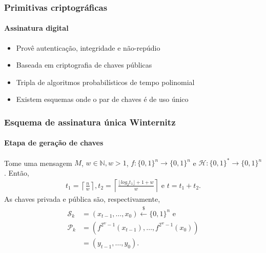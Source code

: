 \documentclass[12pt]{beamer}
\newcommand{\hh}{\mathcal{H}}
\newcommand{\pk}{\mathcal{P}_k}
\newcommand{\sk}{\mathcal{S}_k}
\newcommand{\binwds}[1]{\{0, 1\}^{#1}}
\newcommand{\fhash}[1]{\hh{}: \binwds{*} \longrightarrow{} \binwds{#1}}
\newcommand{\random}{\stackrel{\$}{\longleftarrow}}
\begin{document}
\begin{frame}
  \frametitle{Primitivas criptográficas}
  \framesubtitle{Assinatura digital}
  \begin{itemize}
    \item Provê autenticação, integridade e não-repúdio
    \item Baseada em criptografia de chaves públicas
    \item Tripla de algoritmos probabilísticos
      de tempo polinomial~\cite{Goldreich:book:2004}
  \end{itemize}
  \begin{figure}
    \centering
  \end{figure}
  \begin{itemize}
    \item Existem esquemas onde o par de chaves é de uso único
  \end{itemize}
\end{frame}

\begin{frame}
  \frametitle{Esquema de assinatura única Winternitz}
  \framesubtitle{Etapa de geração de chaves}
  Tome uma mensagem $M$, $w \in \mathbb{N}, w > 1$,
  $f : \binwds{n} \longrightarrow \binwds{n}$ e $\fhash{n}$. Então,
  \begin{align*}
    t_1 = \left\lceil \frac{n}{w} \right\rceil,
    t_2 = \left\lceil \frac{\lfloor log_2 t_1 \rfloor + 1 + w}{w} \right\rceil
    \text{ e } t = t_1 + t_2.
  \end{align*}
  As chaves privada e pública são, respectivamente,
  \begin{align*}
    \sk{} &= (x_{t - 1}, \dots, x_{0}) \random{} \binwds{n} \text{ e}\\
    \pk{} &= (f^{2^w - 1}(x_{t - 1}), \dots, f^{2^w - 1}(x_0)) \\
          &= (y_{t - 1}, \dots, y_0).
   \end{align*}
\end{frame}
\end{document}
